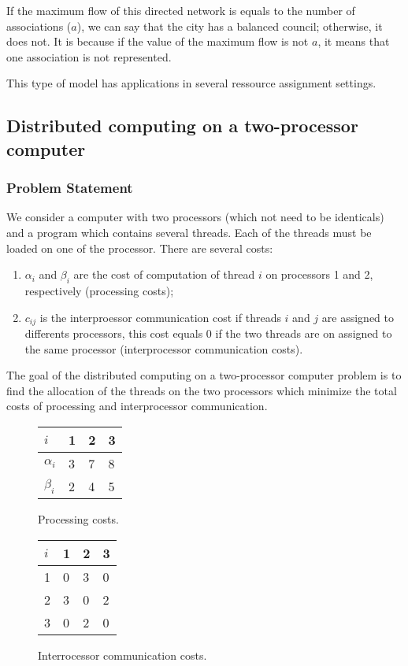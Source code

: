 If the maximum flow of this directed network is equals to the number of associations ($a$), we can say that the city has a balanced council; otherwise, it does not. It is because if the value of the maximum flow is not $a$, it means that one association is not represented.

This type of model has applications in several ressource assignment settings.


\subsection{Distributed computing on a two-processor computer}

\subsubsection{Problem Statement}
We consider a computer with two processors (which not need to be identicals) and a program which contains several threads. Each of the threads must be loaded on one of the processor. There are several costs:
\begin{enumerate}
	\item $\alpha_i$ and $\beta_i$ are the cost of computation of thread $i$ on processors 1 and 2, respectively (processing costs);
	\item $c_{ij}$ is the interproessor communication cost if threads $i$ and $j$ are assigned to differents processors, this cost equals $0$ if the two threads are on assigned to the same processor (interprocessor communication costs).
\end{enumerate}
The goal of the distributed computing on a two-processor computer problem is to find the allocation of the threads on the two processors which minimize the total costs of processing and interprocessor communication.

\begin{figure}[H]
\centering
\begin{tabular}{|l|l|l|l|}
	\hline
	$i$ & 1 & 2 & 3 \\
	\hline
	$\alpha_i$ & 3 & 7 & 8 \\
	\hline
	$\beta_i$ & 2 & 4 & 5 \\
	\hline
\end{tabular}
\caption{Processing costs.}
\end{figure}

\begin{figure}[H]
\begin{tabular}{|l|l|l|l|}
	\hline
	$i$ & 1 & 2 & 3 \\
	\hline
	1 & 0 & 3 & 0 \\
	\hline
	2 & 3 & 0 & 2 \\
	\hline
	3 & 0 & 2 & 0 \\
	\hline
\end{tabular}
\centering
\caption{Interrocessor communication costs.}
\end{figure}

